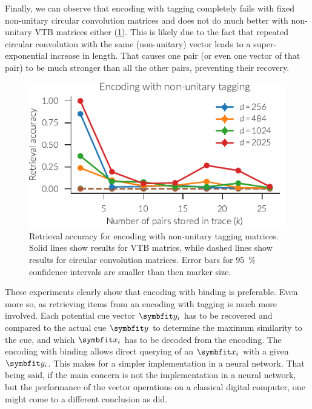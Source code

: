 Finally, we can observe that encoding with tagging completely fails with fixed non-unitary circular convolution matrices and does not do much better with non-unitary VTB matrices either (\cref{fig:encoding-nonunitary-tagging}).
This is likely due to the fact that repeated circular convolution with the same (non-unitary) vector leads to a super-exponential increase in length.
That causes one pair (or even one vector of that pair) to be much stronger than all the other pairs, preventing their recovery.
\begin{figure}
    \centering
    \includegraphics{figures/encoding-nonunitary-tagging}
    \caption[Retrieval accuracy of encoding with non-unitary tagging matrices.]{Retrieval accuracy for encoding with non-unitary tagging matrices. Solid lines show results for VTB matrics, while dashed lines show results for circular convolution matrices. Error bars for \SI{95}{\percent} confidence intervals are smaller than then marker size.}\label{fig:encoding-nonunitary-tagging}
\end{figure}

These experiments clearly show that encoding with binding is preferable.
Even more so, as retrieving items from an encoding with tagging is much more involved.
Each potential cue vector $\vc y_i$ has to be recovered and compared to the actual cue $\vc y$ to determine the maximum similarity to the cue, and which $\vc x_i$ has to be decoded from the encoding.
The encoding with binding allows direct querying of an $\vc x_i$ with a given $\vc y_i$.
This makes for a simpler implementation in a neural network.
That being said, if the main concern is not the implementation in a neural network, but the performance of the vector operations on a classical digital computer, one might come to a different conclusion as \textcite{recchia2015} did.
